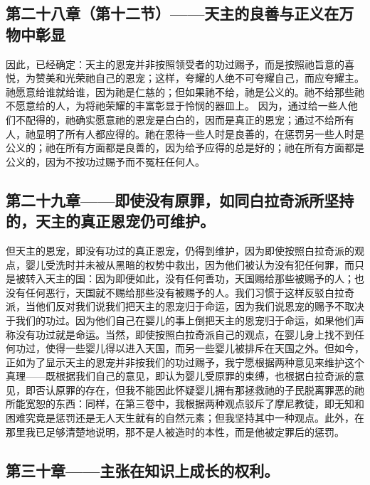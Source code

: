 \subsection{第二十八章（第十二节）——天主的良善与正义在万物中彰显}

因此，已经确定：天主的恩宠并非按照领受者的功过赐予，而是按照祂旨意的喜悦，为赞美和光荣祂自己的恩宠；这样，夸耀的人绝不可夸耀自己，而应夸耀主。祂愿意给谁就给谁，因为祂是仁慈的；但如果祂不给，祂是公义的。祂不给那些祂不愿意给的人，为将祂荣耀的丰富彰显于怜悯的器皿上。 因为，通过给一些人他们不配得的，祂确实愿意祂的恩宠是白白的，因而是真正的恩宠；通过不给所有人，祂显明了所有人都应得的。祂在恩待一些人时是良善的，在惩罚另一些人时是公义的；祂在所有方面都是良善的，因为给予应得的总是好的；祂在所有方面都是公义的，因为不按功过赐予而不冤枉任何人。\par


\subsection{第二十九章——即使没有原罪，如同白拉奇派所坚持的，天主的真正恩宠仍可维护。}

但天主的恩宠，即没有功过的真正恩宠，仍得到维护，因为即使按照白拉奇派的观点，婴儿受洗时并未被从黑暗的权势中救出，因为他们被认为没有犯任何罪，而只是被转入天主的国：因为即便如此，没有任何善功，天国赐给那些被赐予的人；也没有任何恶行，天国就不赐给那些没有被赐予的人。我们习惯于这样反驳白拉奇派，当他们反对我们说我们把天主的恩宠归于命运，因为我们说恩宠的赐予不取决于我们的功过。因为他们自己在婴儿的事上倒把天主的恩宠归于命运，如果他们声称没有功过就是命运。当然，即使按照白拉奇派自己的观点，在婴儿身上找不到任何功过，使得一些婴儿得以进入天国，而另一些婴儿被排斥在天国之外。但如今，正如为了显示天主的恩宠并非按我们的功过赐予，我宁愿根据两种意见来维护这个真理——既根据我们自己的意见，即认为婴儿受原罪的束缚，也根据白拉奇派的意见，即否认原罪的存在，但我不能因此怀疑婴儿拥有那拯救祂的子民脱离罪恶的祂所能宽恕的东西：同样，在第三卷中，我根据两种观点驳斥了摩尼教徒，即无知和困难究竟是惩罚还是无人天生就有的自然元素；但我坚持其中一种观点。此外，在那里我已足够清楚地说明，那不是人被造时的本性，而是他被定罪后的惩罚。\par


\subsection{第三十章——主张在知识上成长的权利。}

